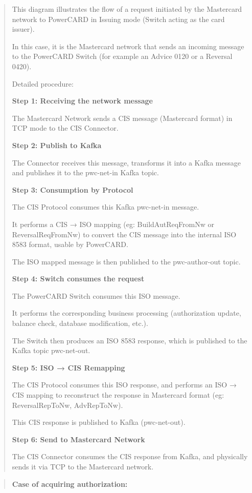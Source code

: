 \documentclass[12pt,a4paper]{report}
\begin{document}
\begin{quote}
This diagram illustrates the flow of a request initiated by the
Mastercard network to PowerCARD in Issuing mode (Switch acting as the
card issuer).

In this case, it is the Mastercard network that sends an incoming
message to the PowerCARD Switch (for example an Advice 0120 or a
Reversal 0420).

Detailed procedure:

\textbf{Step 1: Receiving the network message}

The Mastercard Network sends a CIS message (Mastercard format) in TCP
mode to the CIS Connector.

\textbf{Step 2: Publish to Kafka}

The Connector receives this message, transforms it into a Kafka message
and publishes it to the pwc-net-in Kafka topic.

\textbf{Step 3: Consumption by Protocol}

The CIS Protocol consumes this Kafka pwc-net-in message.

It performs a CIS → ISO mapping (eg: BuildAutReqFromNw or
ReversalReqFromNw) to convert the CIS message into the internal ISO 8583
format, usable by PowerCARD.

The ISO mapped message is then published to the pwc-author-out topic.

\textbf{Step 4: Switch consumes the request}

The PowerCARD Switch consumes this ISO message.

It performs the corresponding business processing (authorization update,
balance check, database modification, etc.).

The Switch then produces an ISO 8583 response, which is published to the
Kafka topic pwc-net-out.

\textbf{Step 5: ISO → CIS Remapping}

The CIS Protocol consumes this ISO response, and performs an ISO → CIS
mapping to reconstruct the response in Mastercard format (eg:
ReversalRepToNw, AdvRepToNw).

This CIS response is published to Kafka (pwc-net-out).

\textbf{Step 6: Send to Mastercard Network}

The CIS Connector consumes the CIS response from Kafka, and physically
sends it via TCP to the Mastercard network.
\end{quote}

\begin{quote}
    \textbf{Case of acquiring authorization:}
\end{quote}
\end{document}
